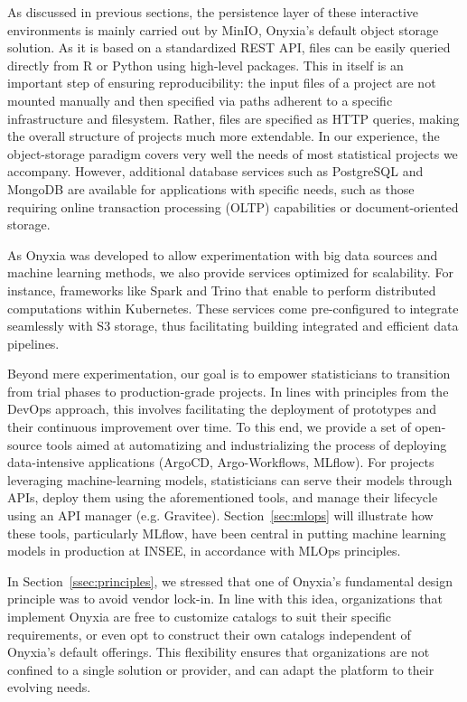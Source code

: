 \documentclass[graybox]{svmult}
\begin{document}
As discussed in previous sections, the persistence layer of these interactive environments is mainly carried out by MinIO, Onyxia's default object storage solution. As it is based on a standardized REST API, files can be easily queried directly from R or Python using high-level packages. This in itself is an important step of ensuring reproducibility: the input files of a project are not mounted manually and then specified via paths adherent to a specific infrastructure and filesystem. Rather, files are specified as HTTP queries, making the overall structure of projects much more extendable. In our experience, the object-storage paradigm covers very well the needs of most statistical projects we accompany. However, additional database services such as PostgreSQL and MongoDB are available for applications with specific needs, such as those requiring online transaction processing (OLTP) capabilities or document-oriented storage.

As Onyxia was developed to allow experimentation with big data sources and machine learning methods, we also provide services optimized for scalability. For instance, frameworks like Spark and Trino that enable to perform distributed computations within Kubernetes. These services come pre-configured to integrate seamlessly with S3 storage, thus facilitating building integrated and efficient data pipelines.

Beyond mere experimentation, our goal is to empower statisticians to transition from trial phases to production-grade projects. In lines with principles from the DevOps approach, this involves facilitating the deployment of prototypes and their continuous improvement over time. To this end, we provide a set of open-source tools aimed at automatizing and industrializing the process of deploying data-intensive applications (ArgoCD, Argo-Workflows, MLflow). For projects leveraging machine-learning models, statisticians can serve their models through APIs, deploy them using the aforementioned tools, and manage their lifecycle using an API manager (e.g. Gravitee). Section~\ref{sec:mlops} will illustrate how these tools, particularly MLflow, have been central in putting machine learning models in production at INSEE, in accordance with MLOps principles.

In Section~\ref{ssec:principles}, we stressed that one of Onyxia's fundamental design principle was to avoid vendor lock-in. In line with this idea, organizations that implement Onyxia are free to customize catalogs to suit their specific requirements, or even opt to construct their own catalogs independent of Onyxia's default offerings. This flexibility ensures that organizations are not confined to a single solution or provider, and can adapt the platform to their evolving needs.
\end{document}
